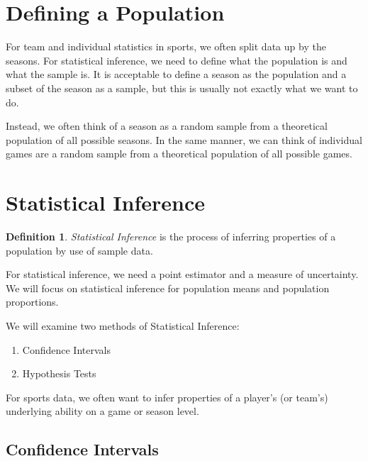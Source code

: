 \documentclass[
  11pt,
]{book}
\providecommand{\tightlist}{%
  \setlength{\itemsep}{0pt}\setlength{\parskip}{0pt}}
\theoremstyle{definition}
\newtheorem{definition}{Definition}[chapter]
\theoremstyle{definition}
\theoremstyle{definition}
\theoremstyle{definition}
\theoremstyle{remark}
\begin{document}
\hypertarget{defining-a-population}{%
\section{Defining a Population}\label{defining-a-population}}

For team and individual statistics in sports, we often split data up by the seasons. For statistical inference, we need to define what the population is and what the sample is. It is acceptable to define a season as the population and a subset of the season as a sample, but this is usually not exactly what we want to do.

Instead, we often think of a season as a random sample from a theoretical population of all possible seasons. In the same manner, we can think of individual games are a random sample from a theoretical population of all possible games.

\hypertarget{statistical-inference}{%
\section{Statistical Inference}\label{statistical-inference}}

\begin{definition}
\emph{Statistical Inference} is the process of inferring properties of a population by use of sample data.
\end{definition}

For statistical inference, we need a point estimator and a measure of uncertainty. We will focus on statistical inference for population means and population proportions.

We will examine two methods of Statistical Inference:

\begin{enumerate}
\def\labelenumi{\arabic{enumi}.}
\tightlist
\item
  Confidence Intervals
\item
  Hypothesis Tests
\end{enumerate}

For sports data, we often want to infer properties of a player's (or team's) underlying ability on a game or season level.

\newpage

\hypertarget{confidence-intervals}{%
\subsection{Confidence Intervals}\label{confidence-intervals}}
\end{document}
